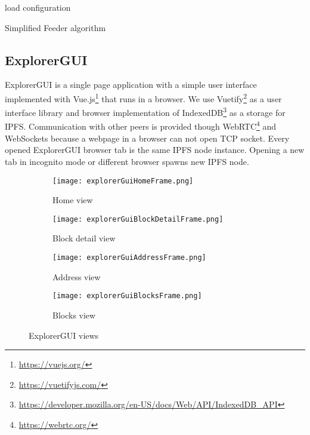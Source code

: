 \begin{algorithm}[H]
    \SetAlgoLined
    load configuration\;
    \caption{Simplified Feeder algorithm}
    \label{feederAlgo}
\end{algorithm}


\subsection{ExplorerGUI}
ExplorerGUI is a single page application with a simple user interface implemented with Vue.js\footnote{\url{https://vuejs.org/}} that runs in a browser. We use Vuetify\footnote{\url{https://vuetifyjs.com/}} as a user interface library and browser implementation of IndexedDB\footnote{\url{https://developer.mozilla.org/en-US/docs/Web/API/IndexedDB_API}} as a storage for IPFS. Communication with other peers is provided though WebRTC\footnote{\url{https://webrtc.org/}} and WebSockets because a webpage in a browser can not open TCP socket. Every opened ExplorerGUI browser tab is the same IPFS node instance. Opening a new tab in incognito mode or different browser spawns new IPFS node.


\begin{figure}[h]
    \centering
    \begin{subfigure}[t]{.5\textwidth}
        \centering
        \texttt{[image: explorerGuiHomeFrame.png]}
        \caption{Home view}
        \label{homeView}
    \end{subfigure}%
    \begin{subfigure}[t]{.5\textwidth}
        \centering
        \texttt{[image: explorerGuiBlockDetailFrame.png]}
        \caption{Block detail view}
        \label{blockDetailView}
    \end{subfigure}
    \begin{subfigure}[t]{.5\textwidth}
        \centering
        \texttt{[image: explorerGuiAddressFrame.png]}
        \caption{Address view}
        \label{addressView}
    \end{subfigure}%
    \begin{subfigure}[t]{.5\textwidth}
        \centering
        \texttt{[image: explorerGuiBlocksFrame.png]}
        \caption{Blocks view}
        \label{blocksView}
    \end{subfigure}
    \caption{ExplorerGUI views}
\end{figure}


